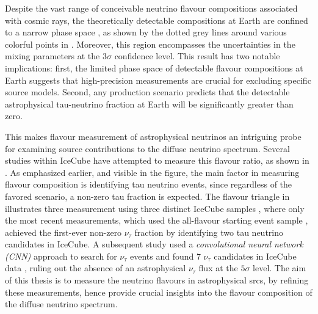 Despite the vast range of conceivable neutrino flavour compositions associated with cosmic rays, the theoretically detectable compositions at Earth are confined to a narrow phase space , as shown by the dotted grey lines around various colorful points in . Moreover, this region encompasses the uncertainties in the mixing parameters at the $3\sigma$ confidence level. This result has two notable implications: first, the limited phase space of detectable flavour compositions at Earth suggests that high-precision measurements are crucial for excluding specific source models. Second, any production scenario predicts that the detectable astrophysical tau-neutrino fraction at Earth will be significantly greater than zero.

This makes flavour measurement of astrophysical neutrinos an intriguing probe for examining source contributions to the diffuse neutrino spectrum. Several studies within IceCube have attempted to measure this flavour ratio, as shown in . As emphasized earlier, and visible in the figure, the main factor in measuring flavour composition is identifying tau neutrino events, since regardless of the favored scenario, a non-zero tau fraction is expected. The flavour triangle in  illustrates three measurement using three distinct IceCube samples , where only the most recent measurements, which used the all-flavour starting event sample \cite{Juliana_paper}, achieved the first-ever non-zero $\nu_\tau$ fraction by identifying two tau neutrino candidates in IceCube. A subsequent study used a \emph{convolutional neural network (CNN)} approach to search for $\nu_\tau$ events and found 7 $\nu_\tau$ candidates in IceCube data , ruling out the absence of an astrophysical $\nu_\tau$ flux at the $5\sigma$ level. The aim of this thesis is to measure the neutrino flavours in astrophysical srcs, by refining these measurements, hence provide crucial insights into the flavour composition of the diffuse neutrino spectrum.



